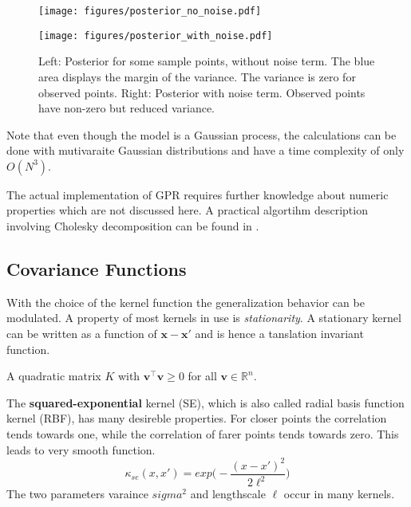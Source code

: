 \documentclass[english]{article}
\newcommand{\x}{\mathbf{x}}
\begin{document}
\begin{figure}

  \begin{minipage}{0.5\textwidth}
  \texttt{[image: figures/posterior\_no\_noise.pdf]}
  \end{minipage}%
  \begin{minipage}{0.5\textwidth}
  \texttt{[image: figures/posterior\_with\_noise.pdf]}
  \end{minipage}%

  \caption{Left: Posterior for some sample points, without noise term. The blue area displays the margin of the variance. The variance is zero for observed points. Right: Posterior with noise term. Observed points have non-zero but reduced variance.}
  \label{gpr}
\end{figure}


Note that even though the model is a Gaussian process, the calculations can be done with mutivaraite Gaussian distributions and have a time complexity of only $O(N^3)$.

The actual implementation of \ac{GPR} requires further knowledge about numeric properties which are not discussed here. A practical algortihm description involving Cholesky decomposition can be found in \cite[Algorithm 2.1]{rasmussen_gaussian_2006}.




\subsection{Covariance Functions}
With the choice of the kernel function the generalization behavior can be modulated.  A property of most kernels in use is \textit{stationarity}. A stationary kernel can be written as a function of $\x-\x'$ and is hence a tanslation invariant function.

A quadratic matrix $K$ with $\mathbf{v}^\top \mathbf{v} \ge 0$ for all $\mathbf{v} \in \mathbb{R}^n$.

The \textbf{squared-exponential} kernel (SE), which is also called radial basis function kernel (RBF), has many desireble properties. For closer points the correlation tends towards one, while the correlation of farer points tends towards zero. This leads to very smooth function.
$$\kappa_{se}(x, x') = exp\bigg(-\frac{(x-x')^2}{2\ell^2}\bigg)$$
The two parameters varaince $sigma^2$ and lengthscale $\ell$ occur in many kernels.
\end{document}
